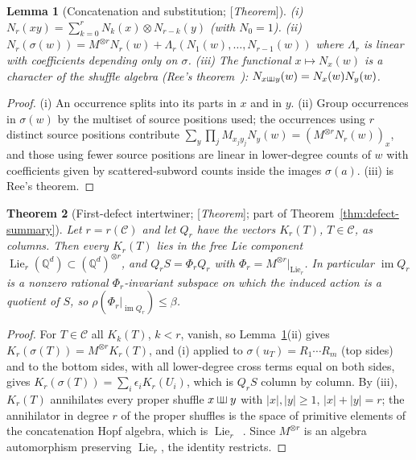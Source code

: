 \documentclass[11pt]{amsart}
\theoremstyle{plain}
\newtheorem{theorem}{Theorem}[section]
\newtheorem{lemma}[theorem]{Lemma}
\theoremstyle{definition}
\theoremstyle{remark}
\newcommand{\Q}{\mathbb{Q}}
\newcommand{\cC}{\mathcal{C}}
\newcommand{\Lie}{\operatorname{Lie}}
\newcommand{\Status}[1]{\textup{[\textit{#1}]}}
\newcommand{\shuffle}{\mathbin{\sqcup\mkern-7mu\sqcup}}
\begin{document}
\begin{lemma}[Concatenation and substitution; \Status{Theorem}]\label{lem:conc-subst}
(i) $N_r(xy)=\sum_{k=0}^{r}N_k(x)\otimes N_{r-k}(y)$ (with $N_0=1$). (ii) $N_r(\sigma(w))=M^{\otimes r}N_r(w)+\Lambda_r(N_1(w),\dots,N_{r-1}(w))$ where $\Lambda_r$ is linear with coefficients depending only on $\sigma$. (iii) The functional $x\mapsto N_x(w)$ is a character of the shuffle algebra (Ree's theorem~\cite[Thm.~3.6]{Reutenauer}): $N_{x\shuffle y}(w)=N_x(w)N_y(w)$.
\end{lemma}
\begin{proof}
(i) An occurrence splits into its parts in $x$ and in $y$. (ii) Group occurrences in $\sigma(w)$ by the multiset of source positions used; the occurrences using $r$ distinct source positions contribute $\sum_{y}\prod_jM_{x_jy_j}N_y(w)=(M^{\otimes r}N_r(w))_x$, and those using fewer source positions are linear in lower-degree counts of $w$ with coefficients given by scattered-subword counts inside the images $\sigma(a)$. (iii) is Ree's theorem.
\end{proof}

\begin{theorem}[First-defect intertwiner; \Status{Theorem}; part of Theorem~\ref{thm:defect-summary}]\label{thm:defect-intertwiner}
Let $r=r(\cC)$ and let $Q_r$ have the vectors $K_r(T)$, $T\in\cC$, as columns. Then every $K_r(T)$ lies in the free Lie component $\Lie_r(\Q^d)\subset(\Q^d)^{\otimes r}$, and $Q_rS=\Phi_rQ_r$ with $\Phi_r=M^{\otimes r}|_{\Lie_r}$. In particular $\operatorname{im}Q_r$ is a nonzero rational $\Phi_r$-invariant subspace on which the induced action is a quotient of $S$, so $\rho(\Phi_r|_{\operatorname{im}Q_r})\le\beta$.
\end{theorem}
\begin{proof}
For $T\in\cC$ all $K_k(T)$, $k<r$, vanish, so Lemma~\ref{lem:conc-subst}(ii) gives $K_r(\sigma(T))=M^{\otimes r}K_r(T)$, and (i) applied to $\sigma(u_T)=R_1\cdots R_m$ (top sides) and to the bottom sides, with all lower-degree cross terms equal on both sides, gives $K_r(\sigma(T))=\sum_i\epsilon_iK_r(U_i)$, which is $Q_rS$ column by column. By (iii), $K_r(T)$ annihilates every proper shuffle $x\shuffle y$ with $|x|,|y|\ge1$, $|x|+|y|=r$; the annihilator in degree $r$ of the proper shuffles is the space of primitive elements of the concatenation Hopf algebra, which is $\Lie_r$~\cite[Thm.~3.1]{Reutenauer}. Since $M^{\otimes r}$ is an algebra automorphism preserving $\Lie_r$, the identity restricts.
\end{proof}
\end{document}
